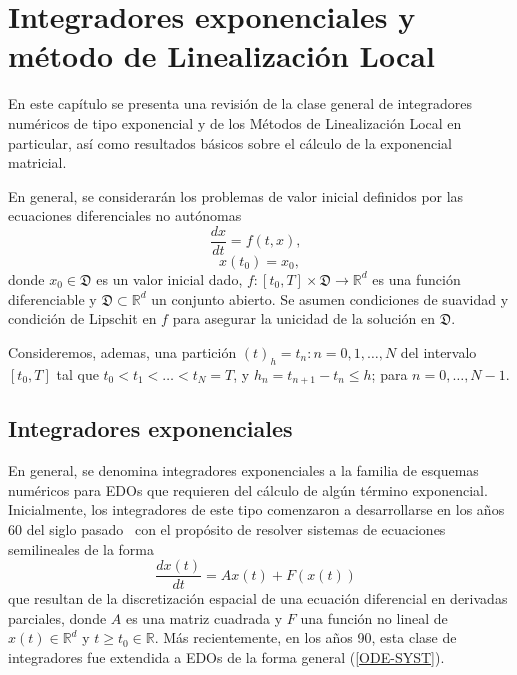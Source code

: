 \chapter{Integradores exponenciales y método de Linealización Local}\label{chapter:exp-int-and-ll-methods}

En este capítulo se presenta una revisión de la clase general de  integradores numéricos de tipo exponencial y de los Métodos de Linealización Local en particular, así como resultados básicos sobre el cálculo de la exponencial matricial.

En general, se considerarán los problemas de valor inicial definidos por las ecuaciones diferenciales no autónomas
 \begin{equation}
 \frac{dx}{dt}=f(t,x), \;\; \label{ODE-SYST}
 \end{equation}
 \begin{equation*}
 x(t_0)=x_0,
 \end{equation*}
 donde $x_0\in \mathfrak{D}$ es un valor inicial dado, $f: [t_0,T] \times \mathfrak{D}\longrightarrow \mathbb{R}^{d}$ es una función diferenciable y $\mathfrak{D}\subset\mathbb{R}^{d}$ un conjunto abierto. Se asumen condiciones de suavidad y condición de Lipschit en $f$ para asegurar la unicidad de la solución en $\mathfrak{D}$.

Consideremos, ademas, una partición $(t)_{h}={t_{n}:n=0,1,\ldots,N}$ del
intervalo $[t_{0},T]$ tal que $t_{0}<t_{1}<\ldots<t_{N}=T$, y $%
h_{n}=t_{n+1}-t_{n}\leq h$; para $n=0,\ldots,N-1$.

\section{Integradores exponenciales}

En general, se denomina integradores exponenciales a la familia
de esquemas numéricos para EDOs que requieren del cálculo de algún término exponencial. Inicialmente, los integradores de este tipo comenzaron a desarrollarse en los años 60 del siglo pasado~\cite{Berland07} con el propósito de resolver sistemas de ecuaciones semilineales de la forma
\begin{equation}
\frac{dx(t)}{dt} = Ax(t) + F(x(t))  \;\;  \label{ODE Lines Method}
\end{equation}
que resultan de la discretización espacial de una ecuación diferencial en derivadas parciales, donde $A$ es una
matriz cuadrada y $F$ una función no lineal de $x(t)\in\mathbb{R}^d$ y $t\geq t_0 \in \mathbb{R}$. Más recientemente, en los años 90, esta clase de integradores fue extendida a EDOs de la forma general (\ref{ODE-SYST}).

